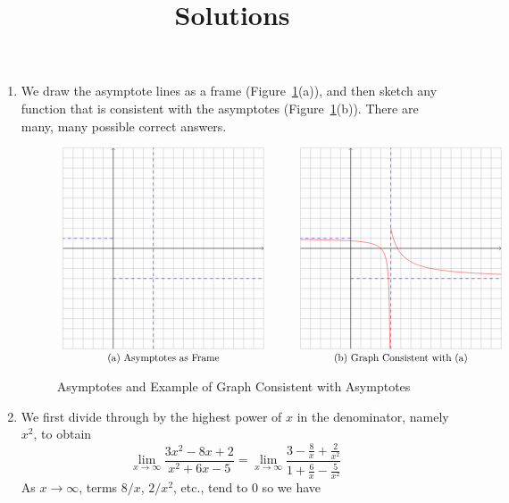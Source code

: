 \documentclass{article}
\title{\commonPSTitleZeroThreeFour\ Solutions}
\author{\commonAuthor}
\date{\commonDateZeroThreeFour}
\begin{document}
\maketitle
\begin{enumerate}
\item %
  We draw the asymptote lines as a frame
  (Figure~\ref{fig:asymptotes}(a)), and then sketch any function that
  is consistent with the asymptotes (Figure~\ref{fig:asymptotes}(b)).
  There are many, many possible correct answers.
  \begin{figure}[htbp]
    \centering
    $\begin{array}{c@{\hspace{0.5in}}c}
    \begin{tikzpicture}[scale=0.35]
      \draw[gray,very thin] (-5,-10) grid (15,10);
      \draw[->] (-5,0)--(15,0);
      \draw[->] (0,-10)--(0,10);
      \draw[color=blue,dashed] (0,1)--(-5,1);
      \draw[color=blue,dashed] (0,-3)--(15,-3);
      \draw[color=blue,dashed] (4,-10)--(4,10);
    \end{tikzpicture}
    &
    \begin{tikzpicture}[scale=0.35]
      \draw[gray,very thin] (-5,-10) grid (15,10);
      \draw[->] (-5,0)--(15,0);
      \draw[->] (0,-10)--(0,10);
      \draw[color=blue,dashed] (0,1)--(-5,1);
      \draw[color=blue,dashed] (0,-3)--(15,-3);
      \draw[color=blue,dashed] (4,-10)--(4,10);
      \draw[color=red,domain=-5:3.9090909,samples=200] plot(\x,{1+1/(\x-4)});
      \draw[color=red,domain=4:15,samples=200] plot(\x,{-3+5/(\x-3)});
    \end{tikzpicture}
    \\
    \mbox{(a) Asymptotes as Frame}
    &
    \mbox{(b) Graph Consistent with (a)}
    \end{array}$
    \caption{Asymptotes and Example of Graph Consistent with Asymptotes}
    \label{fig:asymptotes}
  \end{figure}
\item %
  We first divide through by the highest power of $x$ in the
  denominator, namely $x^2$, to obtain
  \begin{displaymath}
    \lim_{x\to\infty} \frac{3x^2-8x+2}{x^2+6x-5}
    = \lim_{x\to\infty} \frac{3-\frac{8}{x}+\frac{2}{x^2}}{
      1+\frac{6}{x}-\frac{5}{x^2}}
  \end{displaymath}
  As $x\to\infty$, terms $8/x$, $2/x^2$, etc., tend to $0$ so we have
  \begin{displaymath}

\end{displaymath}
\end{enumerate}
\end{document}
